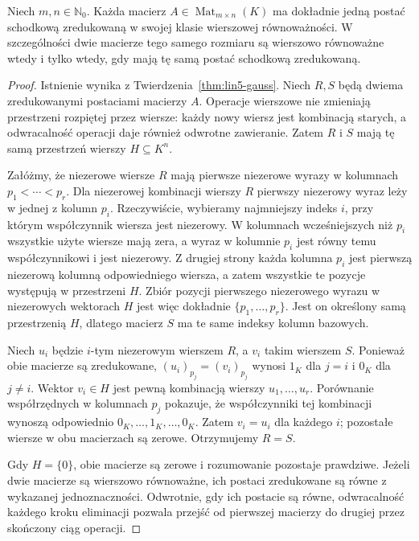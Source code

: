 \begin{twierdzenie}
\label{thm:lin5-jednoznacznosc-rref}
Niech \(m,n\in\mathbb N_0\).
Każda macierz \(A\in\operatorname{Mat}_{m\times n}(K)\)
ma dokładnie jedną postać schodkową
zredukowaną w swojej klasie
wierszowej równoważności.
W szczególności dwie macierze tego samego
rozmiaru są wierszowo równoważne wtedy
i tylko wtedy, gdy mają tę samą
postać schodkową zredukowaną.
\end{twierdzenie}
\begin{proof}
Istnienie wynika z
Twierdzenia~\ref{thm:lin5-gauss}.
Niech \(R,S\) będą dwiema zredukowanymi
postaciami macierzy \(A\).
Operacje wierszowe nie zmieniają
przestrzeni rozpiętej przez wiersze:
każdy nowy wiersz jest kombinacją starych,
a odwracalność operacji daje również
odwrotne zawieranie. Zatem \(R\) i \(S\)
mają tę samą przestrzeń wierszy \(H\subseteq K^n\).

Załóżmy, że niezerowe wiersze \(R\)
mają pierwsze niezerowe wyrazy w kolumnach
\(p_1<\cdots<p_r\). Dla niezerowej
kombinacji wierszy \(R\) pierwszy
niezerowy wyraz leży w jednej z kolumn
\(p_i\). Rzeczywiście, wybieramy
najmniejszy indeks \(i\), przy którym
współczynnik wiersza jest niezerowy.
W kolumnach wcześniejszych niż \(p_i\)
wszystkie użyte wiersze mają zera,
a wyraz w kolumnie \(p_i\) jest równy
temu współczynnikowi i jest niezerowy.
Z drugiej strony każda kolumna \(p_i\)
jest pierwszą niezerową kolumną
odpowiedniego wiersza, a zatem wszystkie
te pozycje występują w przestrzeni \(H\).
Zbiór pozycji pierwszego niezerowego wyrazu
w niezerowych wektorach \(H\) jest więc
dokładnie \(\{p_1,\ldots,p_r\}\).
Jest on określony samą przestrzenią \(H\),
dlatego macierz \(S\) ma te same
indeksy kolumn bazowych.

Niech \(u_i\) będzie \(i\)-tym niezerowym
wierszem \(R\), a \(v_i\) takim wierszem \(S\).
Ponieważ obie macierze są zredukowane,
\((u_i)_{p_j}=(v_i)_{p_j}\)
wynosi \(1_K\) dla \(j=i\)
i \(0_K\) dla \(j\ne i\).
Wektor \(v_i\in H\) jest pewną kombinacją
wierszy \(u_1,\ldots,u_r\).
Porównanie współrzędnych w kolumnach
\(p_j\) pokazuje, że współczynniki
tej kombinacji wynoszą odpowiednio
\(0_K,\ldots,1_K,\ldots,0_K\).
Zatem \(v_i=u_i\) dla każdego \(i\);
pozostałe wiersze w obu macierzach
są zerowe. Otrzymujemy \(R=S\).

Gdy \(H=\{0\}\), obie macierze są
zerowe i rozumowanie pozostaje prawdziwe.
Jeżeli dwie macierze są wierszowo
równoważne, ich postaci zredukowane
są równe z wykazanej jednoznaczności.
Odwrotnie, gdy ich postacie są równe,
odwracalność każdego kroku eliminacji
pozwala przejść od pierwszej macierzy
do drugiej przez skończony ciąg operacji.
\end{proof}

